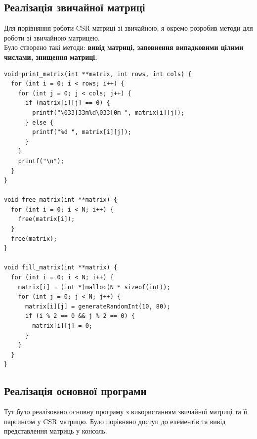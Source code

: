 \clearpage
\subsection{Реалізація звичайної матриці}
    Для порівняння роботи CSR матриці зі звичайною, я окремо розробив методи
для роботи зі звичайною матрицею.\\

    Було створено такі методи: \textbf{вивід матриці, заповнення випадковими цілими числами, 
знищення матриці.}

\begin{lstlisting}[style=customc]
void print_matrix(int **matrix, int rows, int cols) {
  for (int i = 0; i < rows; i++) {
    for (int j = 0; j < cols; j++) {
      if (matrix[i][j] == 0) {
        printf("\033[33m%d\033[0m ", matrix[i][j]);
      } else {
        printf("%d ", matrix[i][j]);
      }
    }
    printf("\n");
  }
}

void free_matrix(int **matrix) {
  for (int i = 0; i < N; i++) {
    free(matrix[i]);
  }
  free(matrix);
}

void fill_matrix(int **matrix) {
  for (int i = 0; i < N; i++) {
    matrix[i] = (int *)malloc(N * sizeof(int));
    for (int j = 0; j < N; j++) {
      matrix[i][j] = generateRandomInt(10, 80);
      if (i % 2 == 0 && j % 2 == 0) {
        matrix[i][j] = 0;
      }
    }
  }
}

\end{lstlisting}

\clearpage
\subsection{Реалізація основної програми}
    Тут було реалізовано основну програму з використанням звичайної матриці та її
парсингом у CSR матрицю. Було порівняно доступ до елементів та вивід представлення 
матриць у консоль.

